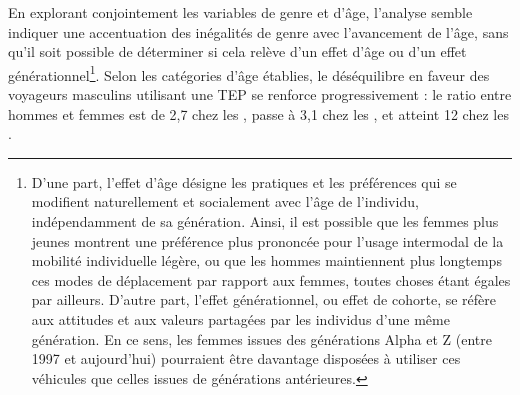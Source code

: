 \begin{refsegment}
En explorant conjointement les variables de genre et d'âge, l'analyse semble indiquer une accentuation des inégalités de genre avec l'avancement de l'âge, sans qu'il soit possible de déterminer si cela relève d'un effet d'âge ou d'un effet générationnel\footnote{
        D'une part, l'effet d'âge désigne les pratiques et les préférences qui se modifient naturellement et socialement avec l'âge de l'individu, indépendamment de sa génération. Ainsi, il est possible que les femmes plus jeunes montrent une préférence plus prononcée pour l'usage intermodal de la mobilité individuelle légère, ou que les hommes maintiennent plus longtemps ces modes de déplacement par rapport aux femmes, toutes choses étant égales par ailleurs. D'autre part, l'effet générationnel, ou effet de cohorte, se réfère aux attitudes et aux valeurs partagées par les individus d'une même génération. En ce sens, les femmes issues des générations Alpha et Z (entre 1997 et aujourd'hui) pourraient être davantage disposées à utiliser ces véhicules que celles issues de générations antérieures.
}. Selon les catégories d'âge établies, le déséquilibre en faveur des voyageurs masculins utilisant une \acrshort{TEP} se renforce progressivement : le ratio entre hommes et femmes est de 2,7 chez les , passe à 3,1 chez les , et atteint 12 chez les .%


\end{refsegment}
